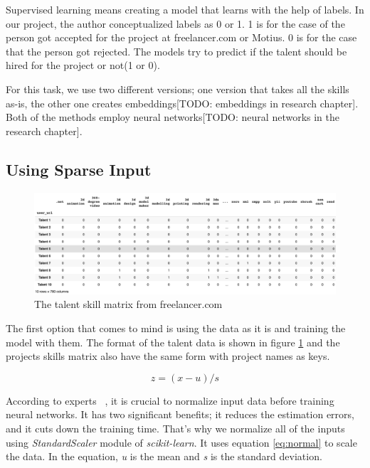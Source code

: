 Supervised learning means creating a model that learns with the help of labels. In our project, the author conceptualized labels as 0 or 1. 1 is for the case of the person got accepted for the project at freelancer.com or Motius. 0 is for the case that the person got rejected. The models try to predict if the talent should be hired for the project or not(1 or 0).


For this task, we use two different versions; one version that takes all the skills as-is, the other one creates embeddings[TODO: embeddings in research chapter]. Both of the methods employ neural networks[TODO: neural networks in the research chapter].


\subsection{Using Sparse Input}

\begin{figure}[!ht]
	\centering
	\includegraphics[width=\textwidth]{figures/FreelancerTalentSkillsMatrix.png}
	\caption{The talent skill matrix from freelancer.com}
	\label{fig:freelancer-talent-matrix}
\end{figure}

The first option that comes to mind is using the data as it is and training the model with them. The format of the talent data is shown in figure \ref{fig:freelancer-talent-matrix} and the projects skills matrix also have the same form with project names as keys.


\begin{equation}
z = (x - u) / s
\label{eq:normal}
\end{equation}

According to experts ~\parencite{sola1997importance}, it is crucial to normalize input data before training neural networks. It has two significant benefits; it reduces the estimation errors, and it cuts down the training time. That's why we normalize all of the inputs using \textit{StandardScaler} module of \textit{scikit-learn}. It uses equation \ref{eq:normal} to scale the data. In the equation, \textit{u} is the mean and \textit{s} is the standard deviation.


